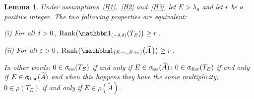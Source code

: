\documentclass[12pt,reqno]{amsart}
\newtheorem{lemma}[theorem]{Lemma}
\renewcommand{\(}{\left(}
\renewcommand{\)}{\right)}
\begin{document}
\begin{lemma}\label{TE equiv A}
Under assumptions~\eqref{H1},~\eqref{H2} and~\eqref{H3},
let $E>\lambda_0$ and let $r$ be a positive integer. The two following properties are equivalent:

{\it (i)} For all $\delta>0\,$, $\mathrm{Rank}\big({\mathbbm 1}_{(-\delta,\delta)}(T_E)\big)\ge r\,$.

{\it (ii)} For all $\varepsilon >0\,$, $\mathrm{Rank}\big({\mathbbm 1}_{(E-\varepsilon,E+\varepsilon)}\big(\widetilde A\,\big)\big)\ge r\,$.

In other words: $0\in\sigma_{\!\rm ess}(T_E)$ if and only if $E\in\sigma_{\!\rm ess}(\widetilde A)$; $0\in\sigma_{\!\rm disc}(T_E)$ if and only if $E\in\sigma_{\!\rm disc}(\widetilde A)$ and when this happens they have the same multiplicity; $0\in\rho(T_E)$ if and only if $E\in\rho(\widetilde A)$.
\end{lemma}
\end{document}
